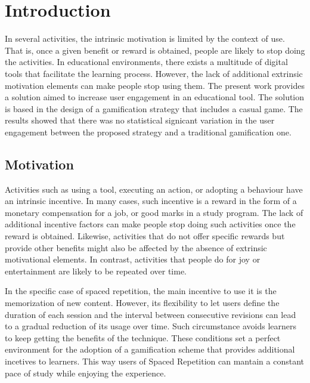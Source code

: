 
\chapter{Introduction} %

\label{intro} %


In several activities, the intrinsic motivation is limited by the context of use. That is, once a given benefit or reward is obtained, people are likely to stop doing the activities. In educational environments, there exists a multitude of digital tools that facilitate the learning process. However, the lack of additional extrinsic motivation elements can make people stop using them. The present work provides a solution aimed to increase user engagement in an educational tool. The solution is based in the design of a gamification strategy that includes a casual game. The results showed that there was no statistical signicant variation in the user engagement between the proposed strategy and a traditional gamification one.

\section{Motivation}
Activities such as using a tool, executing an action, or adopting a behaviour have an intrinsic incentive. In many cases, such incentive is a reward in the form of a monetary compensation for a job, or good marks in a study program. The lack of additional incentive factors can make people stop doing such activities once the reward is obtained. Likewise, activities that do not offer specific rewards but provide other benefits might also be affected by the absence of extrinsic motivational elements. In contrast, activities that people do for joy or entertainment are likely to be repeated over time.

In the specific case of spaced repetition, the main incentive to use it is the memorization of new content. However, its flexibility to let users define the duration of each session and the interval between consecutive revisions can lead to a gradual reduction of its usage over time. Such circumstance avoids learners to keep getting the benefits of the technique. These conditions set a perfect environment for the adoption of a gamification scheme that provides additional incetives to learners. This way users of Spaced Repetition can mantain a constant pace of study while enjoying the experience.

